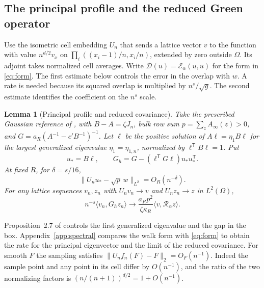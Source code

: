 \documentclass[11pt]{article}
\numberwithin{equation}{section}
\newtheorem{lemma}[theorem]{Lemma}
\begin{document}
\subsection{The principal profile and the reduced Green operator}
\label{sec:spectrum}

Use the isometric cell embedding \(U_n\) that sends a lattice vector \(v\)
to the function with value \(n^{d/2}v_x\) on
\(\prod_i((x_i-1)/n,x_i/n)\), extended by zero outside \(\Omega\).
Its adjoint takes normalized cell averages. Write
\(\mathcal D(u)=\mathcal E_\alpha(u,u)\) for the form in \eqref{eq:form}.
The first estimate below controls the error in the overlap with $w$.
A rate is needed because its squared overlap is multiplied by
$n^s/\sqrt g$. The second estimate identifies the coefficient on
the $n^s$ scale.

\begin{lemma}[Principal profile and reduced covariance]\label{lem:spectrum}
Take the prescribed Gaussian reference of \cite[Section~2]{base}, with
\(B-A=\zeta J_n\), bulk row sum \(p=\sum_z A_\infty(z)>0\), and
\(G=a_R(A^{-1}-c'B^{-1})^{-1}\). Let \(\ell\) be the positive
solution of \(A\ell=\eta_1 B\ell\) for the largest generalized
eigenvalue \(\eta_1=\eta_{1,n}\), normalized by
\(\ell^{\mathsf T}B\ell=1\). Put
\begin{equation}
 u_*=B\ell,\qquad
 G_h=G-(\ell^{\mathsf T}G\ell)u_*u_*^{\mathsf T}.
\end{equation}
At fixed \(R\), for \(\delta=s/16\),
\begin{equation}
 \|U_n u_*-\sqrt p\,w\|_{L^2}=O_R(n^{-\delta}).
\end{equation}
For any lattice sequences \(v_n,z_n\) with \(U_n v_n\to v\) and
\(U_n z_n\to z\) in \(L^2(\Omega)\),
\begin{equation}
 n^{-s}\langle v_n,G_h z_n\rangle
 \longrightarrow \frac{a_Rp^2}{\zeta\kappa_R}
                      \langle v,\mathcal R_\alpha z\rangle .
\end{equation}
\end{lemma}

Proposition~2.7 of \cite{base} controls the first generalized
eigenvalue and the gap in the box. Appendix~\ref{app:spectral}
compares the walk form with \eqref{eq:form} to obtain the rate for
the principal eigenvector and the limit of the reduced covariance.
For smooth $F$ the sampling satisfies
$\|U_nf_n(F)-F\|_2=O_F(n^{-1})$. Indeed the sample point and any
point in its cell differ by $O(n^{-1})$, and the ratio of the two
normalizing factors is $(n/(n+1))^{d/2}=1+O(n^{-1})$.
\end{document}
